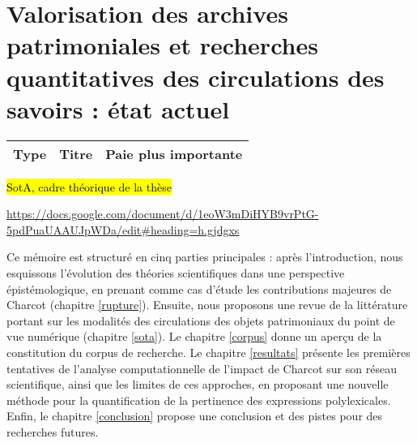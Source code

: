 \section{Valorisation des archives patrimoniales et recherches quantitatives des circulations des savoirs : état actuel}
\label{sect:sota}
	\begin{table}[h]
	\centering
	\begin{tabularx}{\textwidth}{|>{\centering\arraybackslash}p{3.5cm}|>{\centering\arraybackslash}X|>{\centering\arraybackslash}X|}
		\hline
		Type & Titre & Paie plus importante \\
			\hline
	\end{tabularx}
\end{table}

\hl{SotA, cadre théorique de la thèse}

\url{https://docs.google.com/document/d/1eoW3mDiHYB9vrPtG-5pdPuaUAAUJpWDa/edit\#heading=h.gjdgxs}

Ce mémoire est structuré en cinq parties principales : après l'introduction, nous esquissons l'évolution des théories scientifiques dans une perspective épistémologique, en prenant comme cas d'étude les contributions majeures de Charcot (chapitre \ref{rupture}).
Ensuite, nous proposons une revue de la littérature portant sur les modalités des circulations des objets patrimoniaux du point de vue numérique (chapitre \ref{sota}). Le chapitre \ref{corpus} donne un aperçu de la constitution du corpus de recherche. Le chapitre \ref{resultats} présente les premières tentatives de l'analyse computationnelle de l'impact de Charcot sur son réseau scientifique, ainsi que les limites de ces approches, en proposant une nouvelle méthode pour la quantification de la pertinence des expressions polylexicales. Enfin, le chapitre \ref{conclusion} propose une conclusion et des pistes pour des recherches futures.





